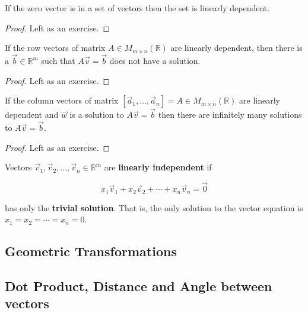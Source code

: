 \begin{proposition}\label{prop:zero_dependent} If the zero vector is in a set of vectors then the set is linearly dependent. 
\end{proposition}
\begin{proof}
Left as an exercise.
\end{proof}


\begin{proposition}\label{prop:zero_dependent} If the row vectors of matrix $A \in M_{m\times n}(\mathbb{R})$ are linearly dependent, then there is a  $\vec{b} \in \mathbb{R}^m$ such that $A\vec{v}=\vec{b}$ does not have a solution.
\end{proposition}
\begin{proof}
Left as an exercise.
\end{proof}

\begin{proposition}\label{prop:zero_dependent} If the column vectors of matrix $[\vec{a}_1, \ldots, \vec{a}_n]=A \in M_{m\times n}(\mathbb{R})$ are linearly dependent and $\vec{w}$ is a solution to $A\vec{v}=\vec{b}$ then there are infinitely many solutions to $A\vec{v}=\vec{b}$.
\end{proposition}
\begin{proof}
Left as an exercise.
\end{proof}

\begin{definition}
Vectors $\vec{v}_1, \vec{v}_2, \ldots, \vec{v}_n \in \mathbb{R}^m$ are \textbf{linearly independent} if 

$$x_1\vec{v}_1+x_2\vec{v}_2+\cdots + x_n \vec{v}_n=\vec{0}$$

has only the \textbf{trivial solution}. That is, the only solution to the vector equation is $x_1=x_2=\cdots=x_n=0$.  
\end{definition}

\subsection{Geometric Transformations}

\subsection{Dot Product, Distance and Angle between vectors}

